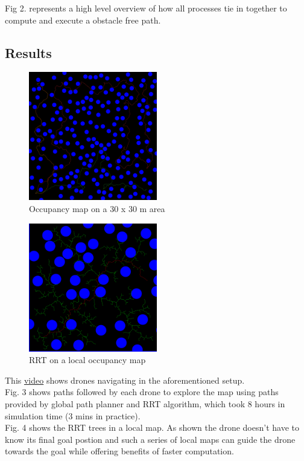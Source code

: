 Fig 2. represents a high level overview of how all processes tie in together to compute and execute a obstacle free path.

\subsection{Results}
\begin{figure}[h]
\centering
\includegraphics[width=0.5\textwidth]{images/preview_map_frame_11193.png}
\caption{Occupancy map on a 30 x 30 m area}
\end{figure}

\begin{figure}[h]
\centering
\includegraphics[width=0.5\textwidth]{images/rrt_drone_2_iter_0.png}
\caption{RRT on a local occupancy map}
\end{figure}

This \href{https://www.youtube.com/watch?v=JBWNEh0Fis4&ab_channel=ShantnavAgarwal}{video} shows drones navigating in the aforementioned setup.\\

Fig. 3 shows paths followed by each drone to explore the map using paths provided by global path planner and RRT algorithm, which took 8 hours in simulation time (3 mins in practice). \\


Fig. 4 shows the RRT trees in a local map. As shown the drone doesn't have to know its final goal postion and such a series of local maps can guide the drone towards the goal while offering benefits of faster computation.